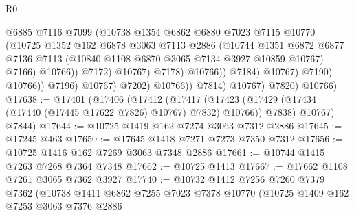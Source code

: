 \begin{lexlean}{R0}
\begin{coremodule}
                                          @6885
                                          @7116
                                          @7099
                                          (@10738
                                            @1354
                                            @6862
                                            @6880
                                            @7023
                                            @7115
                                            @10770
                                            (@10725
                                              @1352
                                              @162
                                              @6878
                                              @3063
                                              @7113
                                              @2886
                                              (@10744
                                                @1351
                                                @6872
                                                @6877
                                                @7136
                                                @7113
                                                (@10840 @1108 @6870 @3065 @7134 @3927 @10859 @10767)
                                                @7166)
                                              @10766))
                                          @7172)
                                        @10767)
                                      @7178)
                                    @10766))
                                @7184)
                              @10767)
                            @7190)
                          @10766))
                      @7196)
                    @10767)
                  @7202)
                @10766))
            @7814)
          @10767)
        @7820)
      @10766)
@17638 := @17401
    (@17406
      (@17412
        (@17417 (@17423 (@17429 (@17434 (@17440 (@17445 @17622 @7826) @10767) @7832) @10766)) @7838)
        @10767)
      @7844)
@17644 := @10725 @1419 @162 @7274 @3063 @7312 @2886
@17645 := @17245 @463
@17650 := @17645 @1418 @7271 @7273 @7350 @7312
@17656 := @10725 @1416 @162 @7269 @3063 @7348 @2886
@17661 := @10744 @1415 @7263 @7268 @7364 @7348
@17662 := @10725 @1413
@17667 := @17662 @1108 @7261 @3065 @7362 @3927
@17740 := @10732
    @1412
    @7256
    @7260
    @7379
    @7362
    (@10738
      @1411
      @6862
      @7255
      @7023
      @7378
      @10770
      (@10725
        @1409
        @162
        @7253
        @3063
        @7376
        @2886

\end{coremodule}
\end{lexlean}
